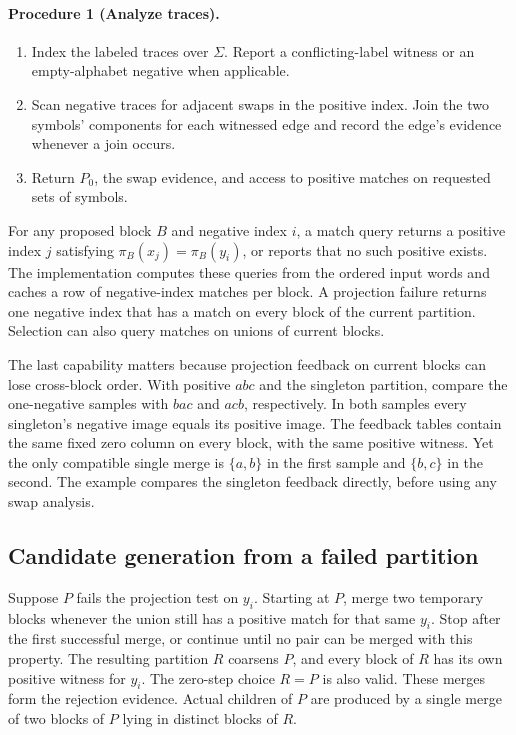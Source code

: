 \paragraph{Procedure 1 (Analyze traces).}
\begin{enumerate}
\item Index the labeled traces over \(\Sigma\). Report a conflicting-label
  witness or an empty-alphabet negative when applicable.
\item Scan negative traces for adjacent swaps in the positive index.
  Join the two symbols' components for each witnessed edge and record
  the edge's evidence whenever a join occurs.
\item Return \(P_0\), the swap evidence, and access to positive matches
  on requested sets of symbols.
\end{enumerate}

For any proposed block \(B\) and negative index \(i\), a match query
returns a positive index \(j\) satisfying
\(\pi_B(x_j)=\pi_B(y_i)\), or reports that no such positive exists.
The implementation computes these queries from the ordered input words
and caches a row of negative-index matches per block. A projection failure
returns one negative index that has a match on every block of the current
partition. Selection can also query matches on unions of current blocks.

The last capability matters because projection feedback on current
blocks can lose cross-block order. With positive \(abc\) and the singleton
partition, compare the one-negative samples with \(bac\) and \(acb\),
respectively. In both samples every singleton's negative image equals its
positive image. The feedback tables contain the same fixed zero column
on every block, with the same positive witness. Yet the only compatible
single merge is \(\{a,b\}\) in the first sample and \(\{b,c\}\) in the
second. The example compares the singleton feedback directly, before
using any swap analysis.

\subsection{Candidate generation from a failed partition}

Suppose \(P\) fails the projection test on \(y_i\). Starting at \(P\),
merge two temporary blocks whenever the union still has a positive
match for that same \(y_i\). Stop after the first successful merge,
or continue until no pair can be merged with this property.
The resulting partition \(R\) coarsens \(P\), and every block of \(R\)
has its own positive witness for \(y_i\). The zero-step choice \(R=P\)
is also valid. These merges form the rejection evidence. Actual
children of \(P\) are produced by a single merge of two blocks of
\(P\) lying in distinct blocks of \(R\).

